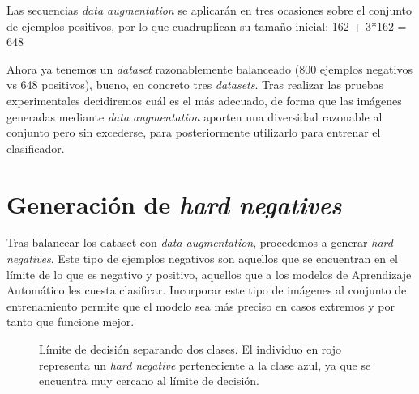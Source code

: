 Las secuencias \textit{data augmentation} se aplicarán en tres ocasiones sobre el conjunto de ejemplos positivos, por lo que cuadruplican su tamaño inicial: 162 + 3*162 = 648

Ahora ya tenemos un \textit{dataset} razonablemente balanceado (800 ejemplos negativos vs 648 positivos), bueno, en concreto tres \textit{datasets}. Tras realizar las pruebas experimentales decidiremos cuál es el más adecuado, de forma que las imágenes generadas mediante \textit{data augmentation} aporten una diversidad razonable al conjunto pero sin excederse, para posteriormente utilizarlo para entrenar el clasificador.



\newpage
\section{Generación de \textit{hard negatives}}
Tras balancear los dataset con \textit{data augmentation}, procedemos a generar \textit{hard negatives}. Este tipo de ejemplos negativos son aquellos que se encuentran en el límite de lo que es negativo y positivo, aquellos que a los modelos de Aprendizaje Automático les cuesta clasificar. Incorporar este tipo de imágenes al conjunto de entrenamiento permite que el modelo sea más preciso en casos extremos y por tanto que funcione mejor.

\begin{figure}[H]
\centering
    \caption{Límite de decisión separando dos clases. El individuo en rojo representa un \textit{hard negative} perteneciente a la clase azul, ya que se encuentra muy cercano al límite de decisión.} 
\end{figure}

